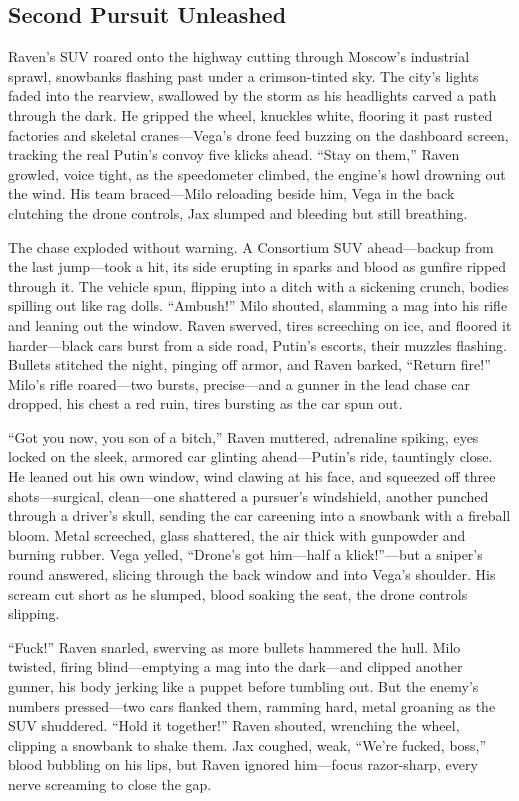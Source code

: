 \documentclass[12pt]{book}
\begin{document}
\subsection{Second Pursuit Unleashed}

Raven’s SUV roared onto the highway cutting through Moscow’s industrial sprawl, snowbanks flashing past under a crimson-tinted sky. The city’s lights faded into the rearview, swallowed by the storm as his headlights carved a path through the dark. He gripped the wheel, knuckles white, flooring it past rusted factories and skeletal cranes—Vega’s drone feed buzzing on the dashboard screen, tracking the real Putin’s convoy five klicks ahead. “Stay on them,” Raven growled, voice tight, as the speedometer climbed, the engine’s howl drowning out the wind. His team braced—Milo reloading beside him, Vega in the back clutching the drone controls, Jax slumped and bleeding but still breathing.

The chase exploded without warning. A Consortium SUV ahead—backup from the last jump—took a hit, its side erupting in sparks and blood as gunfire ripped through it. The vehicle spun, flipping into a ditch with a sickening crunch, bodies spilling out like rag dolls. “Ambush!” Milo shouted, slamming a mag into his rifle and leaning out the window. Raven swerved, tires screeching on ice, and floored it harder—black cars burst from a side road, Putin’s escorts, their muzzles flashing. Bullets stitched the night, pinging off armor, and Raven barked, “Return fire!” Milo’s rifle roared—two bursts, precise—and a gunner in the lead chase car dropped, his chest a red ruin, tires bursting as the car spun out.

“Got you now, you son of a bitch,” Raven muttered, adrenaline spiking, eyes locked on the sleek, armored car glinting ahead—Putin’s ride, tauntingly close. He leaned out his own window, wind clawing at his face, and squeezed off three shots—surgical, clean—one shattered a pursuer’s windshield, another punched through a driver’s skull, sending the car careening into a snowbank with a fireball bloom. Metal screeched, glass shattered, the air thick with gunpowder and burning rubber. Vega yelled, “Drone’s got him—half a klick!”—but a sniper’s round answered, slicing through the back window and into Vega’s shoulder. His scream cut short as he slumped, blood soaking the seat, the drone controls slipping.

“Fuck!” Raven snarled, swerving as more bullets hammered the hull. Milo twisted, firing blind—emptying a mag into the dark—and clipped another gunner, his body jerking like a puppet before tumbling out. But the enemy’s numbers pressed—two cars flanked them, ramming hard, metal groaning as the SUV shuddered. “Hold it together!” Raven shouted, wrenching the wheel, clipping a snowbank to shake them. Jax coughed, weak, “We’re fucked, boss,” blood bubbling on his lips, but Raven ignored him—focus razor-sharp, every nerve screaming to close the gap.
\end{document}
